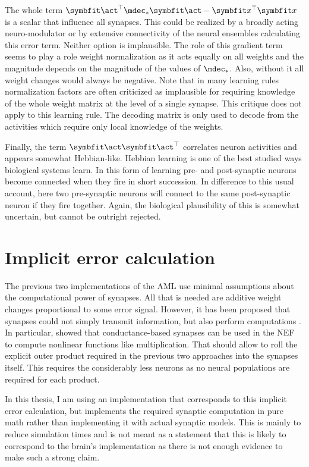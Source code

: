 The whole term $\vc\act\Tr \mdec_* \vc\act - \vc x\Tr \vc x$ is a scalar that influence all synapses.
This could be realized by a broadly acting neuro-modulator or by extensive connectivity of the neural ensembles calculating this error term.
Neither option is implausible.
The role of this gradient term seems to play a role weight normalization as it acts equally on all weights and the magnitude depends on the magnitude of the values of $\mdec_*$.
Also, without it all weight changes would always be negative.
Note that in many learning rules normalization factors are often criticized as implausible for requiring knowledge of the whole weight matrix at the level of a single synapse.
This critique does not apply to this learning rule.
The decoding matrix is only used to decode from the activities which require only local knowledge of the weights.

Finally, the term $\vc\act \vc\act\Tr$ correlates neuron activities and appears somewhat Hebbian-like.
Hebbian learning is one of the best studied ways biological systems learn.
In this form of learning pre- and post-synaptic neurons become connected when they fire in short succession.
In difference to this usual account, here two pre-synaptic neurons will connect to the same post-synaptic neuron if they fire together.
Again, the biological plausibility of this is somewhat uncertain, but cannot be outright rejected.


\section{Implicit error calculation}
The previous two implementations of the AML use minimal assumptions about the computational power of synapses.
All that is needed are additive weight changes proportional to some error signal.
However, it has been proposed that synapses could not simply transmit information, but also perform computations \parencites{abbott2004}[Ch.~5]{koch2004}.
In particular, \textcite{andreasstockel2018} showed that conductance-based synapses can be used in the NEF to compute nonlinear functions like multiplication.
That should allow to roll the explicit outer product required in the previous two approaches into the synapses itself.
This requires the considerably less neurons as no neural populations are required for each product.

In this thesis, I am using an implementation that corresponds to this implicit error calculation, but implements the required synaptic computation in pure math rather than implementing it with actual synaptic models.
This is mainly to reduce simulation times and is not meant as a statement that this is likely to correspond to the brain's implementation as there is not enough evidence to make such a strong claim.


